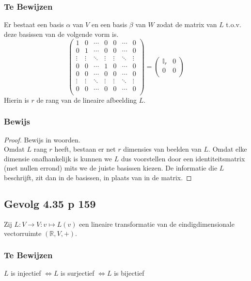 \documentclass[lineaire_algebra_oplossingen.tex]{subfiles}
\begin{document}
\subsubsection*{Te Bewijzen}
Er bestaat een basis $\alpha$ van $V$ en een basis $\beta$ van $W$ zodat de matrix van $L$ t.o.v. deze basissen van de volgende vorm is.
\[
\begin{pmatrix}
1 & 0 & \cdots & 0 & 0 & \cdots & 0\\
0 & 1 & \cdots & 0 & 0 & \cdots & 0\\
\vdots & \vdots & \ddots & \vdots & \vdots & \ddots & \vdots\\
0 & 0 & \cdots & 1 & 0 & \cdots & 0\\
0 & 0 & \cdots & 0 & 0 & \cdots & 0\\
\vdots & \vdots & \ddots & \vdots & \vdots & \ddots & \vdots\\
0 & 0 & \cdots & 0 & 0 & \cdots & 0\\
\end{pmatrix}
=
\begin{pmatrix}
\mathbb{I}_r & 0\\
0 & 0\\
\end{pmatrix}
\]
Hierin is $r$ de rang van de lineaire afbeelding $L$.

\subsubsection*{Bewijs}
\begin{proof}
Bewijs in woorden.\\
Omdat $L$ rang $r$ heeft, bestaan er net $r$ dimensies van beelden van $L$. Omdat elke dimensie onafhankelijk is kunnen we $L$ dus voorstellen door een identiteitsmatrix (met nullen errond) mits we de juiste basissen kiezen. De informatie die $L$ beschrijft, zit dan in de basissen, in plaats van in de matrix.
\end{proof}


\subsection{Gevolg 4.35 p 159}
\label{4.35}
Zij $L: V\rightarrow V : v\mapsto L(v)$ een lineaire transformatie van de eindigdimensionale vectorruimte $(\mathbb{R},V,+)$.

\subsubsection*{Te Bewijzen}
\begin{center}
$L$ is injectief $\Leftrightarrow L$ is surjectief $\Leftrightarrow L$ is bijectief
\end{center}
\end{document}

